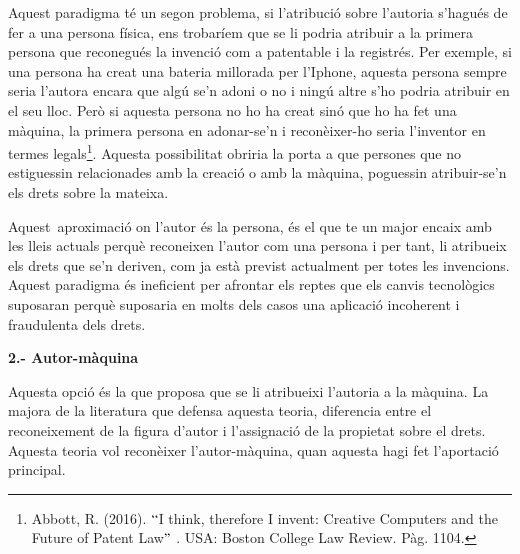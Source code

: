 \documentclass[12pt]{article}
\begin{document}
\vspace{\baselineskip}
\begin{justify}
Aquest paradigma té un segon problema, si l’atribució sobre l’autoria s’hagués de fer a una persona física, ens trobaríem que se li podria atribuir a la primera persona que reconegués la invenció com a patentable i la registrés. Per exemple, si una persona ha creat una bateria millorada per l’Iphone, aquesta persona sempre seria l’autora encara que algú se’n adoni o no i ningú altre s’ho podria atribuir en el seu lloc. Però si aquesta persona no ho ha creat sinó que ho ha fet una màquina, la primera persona en adonar-se’n i reconèixer-ho seria l’inventor en termes legals\footnote{ Abbott, R. (2016). $``$I think, therefore I invent: Creative Computers and the Future of Patent Law$"$ . USA: Boston College Law Review. Pàg. 1104. }. Aquesta possibilitat obriria la porta a que persones que no estiguessin relacionades amb la creació o amb la màquina, poguessin atribuir-se’n els drets sobre la mateixa. 
\end{justify}\par


\vspace{\baselineskip}
\begin{justify}
Aquest\ aproximació on l’autor és la persona, és el que te un major encaix amb les lleis actuals perquè reconeixen l’autor com una persona  i per tant, li atribueix els drets que se’n deriven, com ja està previst actualment per totes les invencions. Aquest paradigma és ineficient per afrontar els reptes que els canvis tecnològics suposaran perquè suposaria en molts dels casos una aplicació incoherent i fraudulenta dels drets.
\end{justify}\par


\vspace{\baselineskip}
\begin{justify}
\textbf{2.- Autor-màquina}
\end{justify}\par


\vspace{\baselineskip}
Aquesta opció és la que proposa que se li atribueixi l’autoria a la màquina. La majora de la literatura que defensa aquesta teoria, diferencia entre el reconeixement de la figura d’autor i l’assignació de la propietat sobre el drets. Aquesta teoria vol reconèixer l’autor-màquina, quan aquesta hagi fet l’aportació principal.\par
\end{document}
